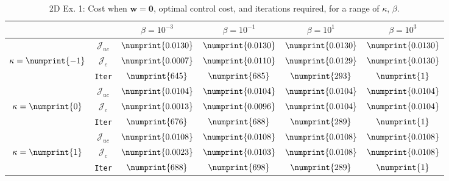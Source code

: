 \begin{table}
\begin{tabular}{ | c | c || c | c | c | c ||}
\hline
\multicolumn{2}{|c||}{}& $\beta = 10^{-3}$ & $\beta = 10^{-1}$ & $\beta = 10^{1}$ & $\beta = 10^{3}$  \\
\hline
\hline
 & $\mathcal{J}_{uc}$ & $\numprint{0.0130}$ & $\numprint{0.0130}$ & $\numprint{0.0130}$ & $\numprint{0.0130}$ \\
$\kappa= \numprint{-1}$  & $\mathcal{J}_c$ & $\numprint{0.0007}$ & $\numprint{0.0110}$ & $\numprint{0.0129}$ & $\numprint{0.0130}$ \\
& \texttt{Iter} & $\numprint{645}$ & $\numprint{685}$ & $\numprint{293}$ & $\numprint{1}$ \\
\hline
 & $\mathcal{J}_{uc}$ & $\numprint{0.0104}$ & $\numprint{0.0104}$ & $\numprint{0.0104}$ & $\numprint{0.0104}$ \\
$\kappa= \numprint{0}$  & $\mathcal{J}_c$ & $\numprint{0.0013}$ & $\numprint{0.0096}$ & $\numprint{0.0104}$ & $\numprint{0.0104}$ \\
& \texttt{Iter} & $\numprint{676}$ & $\numprint{688}$ & $\numprint{289}$ & $\numprint{1}$ \\
\hline
 & $\mathcal{J}_{uc}$ & $\numprint{0.0108}$ & $\numprint{0.0108}$ & $\numprint{0.0108}$ & $\numprint{0.0108}$ \\
$\kappa= \numprint{1}$  & $\mathcal{J}_c$ & $\numprint{0.0023}$ & $\numprint{0.0103}$ & $\numprint{0.0108}$ & $\numprint{0.0108}$ \\
& \texttt{Iter} & $\numprint{688}$ & $\numprint{698}$ & $\numprint{289}$ & $\numprint{1}$ \\
\hline
\end{tabular}
\caption{2D Ex. 1: Cost when $\mathbf{w}=\mathbf{0}$, optimal control cost, and iterations required, for a range of $\kappa$, $\beta$.}
\label{TabS5:Prob12D}
\end{table}